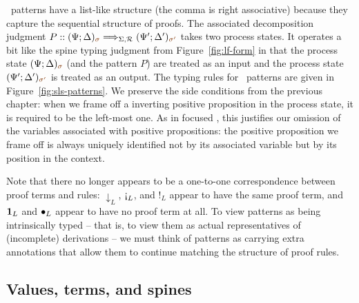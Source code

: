 \sls~patterns have a list-like structure (the comma is right associative)
because they capture the sequential structure of proofs. The associated
decomposition judgment  $P :: (\Psi;
\Delta)_{\lf{\sigma}} \Longrightarrow_{\Sigma,\subord} (\Psi';
\Delta')_{\lf{\sigma'}}$
takes two process states. It operates a bit like the spine typing
judgment from Figure~\ref{fig:lf-form} in that the process state
$(\Psi; \Delta)_{\lf{\sigma}}$ (and the pattern $P$) are treated as an
input and the process state $(\Psi'; \Delta')_{\lf{\sigma'}}$ is
treated as an output.  The typing rules for \sls~patterns are given in
Figure~\ref{fig:sls-patterns}. We preserve the side conditions from
the previous chapter: when we frame off a inverting positive
proposition in the process state, it is required to be the left-most
one. As in focused \ollll, this justifies our omission of the
variables associated with positive propositions: the positive
proposition we frame off is always uniquely identified not by its
associated variable but by its position in the context.

Note that there no longer appears to be a one-to-one
correspondence between proof terms and rules: ${\downarrow}_L$,
${\gnab}_L$, and ${!}_L$ appear to have the same proof term, and
${\mathbf{1}}_L$ and ${\mathbin{\bullet}}_L$ appear to have no proof term at all. To
view patterns as being intrinsically typed -- that is, to view them as
actual representatives of (incomplete) derivations -- we must think of
patterns as carrying extra annotations that allow them to continue
matching the structure of proof rules.



\subsection{Values, terms, and spines}
\label{sec:framework-deductive}

